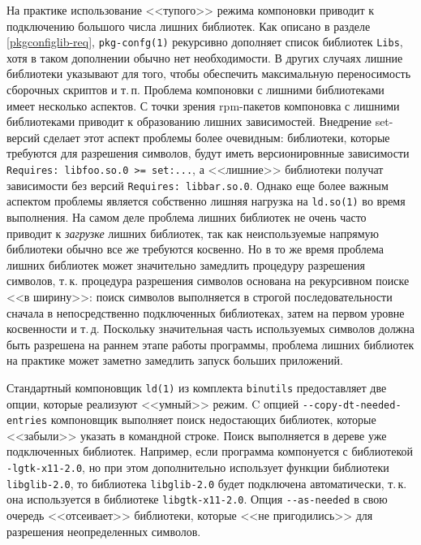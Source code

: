 \documentclass[russian,a4paper,12pt,titlepage]{article}
\begin{document}
На практике использование <<тупого>> режима компоновки приводит к подключению большого числа лишних библиотек.
Как описано в разделе \ref{pkgconfiglib-req}, \verb|pkg-confg(1)| рекурсивно дополняет список библиотек \verb|Libs|,
хотя в таком дополнении обычно нет необходимости.  В других случаях лишние библиотеки указывают для того, чтобы обеспечить
максимальную переносимость сборочных скриптов и т.\,п.  Проблема компоновки с лишними библиотеками имеет несколько аспектов.
С точки зрения rpm-пакетов компоновка с лишними библиотеками приводит к образованию лишних зависимостей.  Внедрение
set-версий сделает этот аспект проблемы более очевидным: библиотеки, которые требуются для разрешения символов, будут
иметь версионировнные зависимости \texttt{Requires: libfoo.so.0 >= set:...}, а <<лишние>> библиотеки получат зависимости
без версий \texttt{Requires: libbar.so.0}.  Однако еще более важным аспектом проблемы является собственно лишняя нагрузка
на \verb|ld.so(1)| во время выполнения.  На самом деле проблема лишних библиотек не очень часто приводит к \emph{загрузке}
лишних библиотек, так как неиспользуемые напрямую библиотеки обычно все же требуются косвенно.  Но в то же время проблема
лишних библиотек может значительно замедлить процедуру разрешения символов, т.\,к. процедура разрешения символов
основана на рекурсивном поиске <<в ширину>>: поиск символов выполняется в строгой последовательности сначала в непосредственно
подключенных библиотеках, затем на первом уровне косвенности и т.\,д.  Поскольку значительная часть используемых символов
должна быть разрешена на раннем этапе работы программы, проблема лишних библиотек на практике может заметно замедлить
запуск больших приложений.

Стандартный компоновщик \verb|ld(1)| из комплекта \verb|binutils| предоставляет две опции, которые реализуют <<умный>> режим.
C опцией \verb|--copy-dt-needed-entries| компоновщик выполняет поиск недостающих библиотек, которые <<забыли>> указать
в командной строке.  Поиск выполняется в дереве уже подключенных библиотек.  Например, если программа компонуется
с библиотекой \verb|-lgtk-x11-2.0|, но при этом дополнительно использует функции библиотеки \verb|libglib-2.0|, то
библиотека \verb|libglib-2.0| будет подключена автоматически, т.\,к. она используется в библиотеке \verb|libgtk-x11-2.0|.
Опция \verb|--as-needed| в свою очередь <<отсеивает>> библиотеки, которые <<не пригодились>> для разрешения неопределенных символов.
\end{document}
